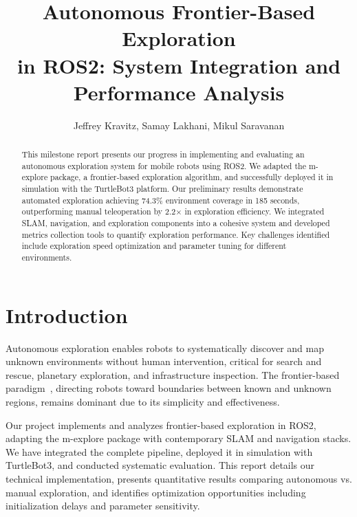 \documentclass[conference]{IEEEtran}
\begin{document}
\title{Autonomous Frontier-Based Exploration\\ in ROS2: System Integration and Performance Analysis}

\author{Jeffrey Kravitz, Samay Lakhani, Mikul Saravanan}

\maketitle

\begin{abstract}
This milestone report presents our progress in implementing and evaluating an autonomous exploration system for mobile robots using ROS2. We adapted the m-explore package, a frontier-based exploration algorithm, and successfully deployed it in simulation with the TurtleBot3 platform. Our preliminary results demonstrate automated exploration achieving 74.3\% environment coverage in 185 seconds, outperforming manual teleoperation by 2.2$\times$ in exploration efficiency. We integrated SLAM, navigation, and exploration components into a cohesive system and developed metrics collection tools to quantify exploration performance. Key challenges identified include exploration speed optimization and parameter tuning for different environments.
\end{abstract}

\IEEEpeerreviewmaketitle

\section{Introduction}

Autonomous exploration enables robots to systematically discover and map unknown environments without human intervention, critical for search and rescue, planetary exploration, and infrastructure inspection. The frontier-based paradigm~\cite{yamauchi1997frontier}, directing robots toward boundaries between known and unknown regions, remains dominant due to its simplicity and effectiveness.

Our project implements and analyzes frontier-based exploration in ROS2, adapting the m-explore package with contemporary SLAM and navigation stacks. We have integrated the complete pipeline, deployed it in simulation with TurtleBot3, and conducted systematic evaluation. This report details our technical implementation, presents quantitative results comparing autonomous vs. manual exploration, and identifies optimization opportunities including initialization delays and parameter sensitivity.
\end{document}
